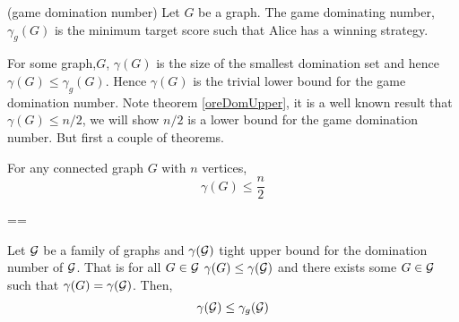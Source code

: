 \begin{definition}(game domination number)
    Let $G$ be a graph. The game dominating number, $\gamma_g(G)$ is the minimum target score such that Alice has a winning strategy.
\end{definition} 

%        
%
%    
%
%
%
%
%    
    
For some graph,$G$, $\gamma(G)$ is the size of the smallest domination set and hence $\gamma(G)\leq\gamma_g(G)$. Hence $\gamma(G)$ is the trivial lower bound for the game domination number. Note theorem \ref{oreDomUpper}, it is a well known result that $\gamma(G) \leq n/2$, we will show $n/2$ is a lower bound for the game domination number. But first a couple of theorems.

\begin{theorem} \label{oreDomUpper} 
    For any connected graph $G$ with $n$ vertices,     
    \[\gamma(G) \leq \frac{n}{2}\]
\end{theorem}
==
\begin{theorem}\label{thm:domlow}
    Let $\mathcal{G}$ be a family of graphs and $\gamma(\mathcal{G})$ tight upper bound for the domination number of $\mathcal{G}$. That is for all $G\in\mathcal{G}$ $\gamma(G)\leq\gamma(\mathcal{G})$ and there exists some $G\in\mathcal{G}$ such that $\gamma(G)=\gamma(\mathcal{G})$. Then,
    \[\gamma(\mathcal{G}) \leq  \gamma_g(\mathcal{G})\]
\end{theorem}

